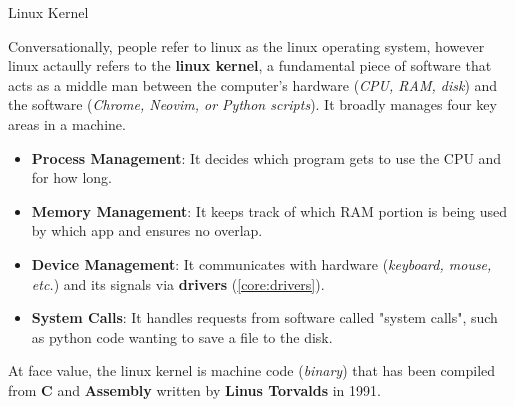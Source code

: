 \documentclass[10pt]{article}
\begin{document}
    \begin{core}{Linux Kernel}

      Conversationally, people refer to linux as the linux operating system, however linux actaully refers to the \textbf{linux kernel}, a fundamental piece of software that acts as a middle man between the computer's hardware (\textit{CPU, RAM, disk}) and the software (\textit{Chrome, Neovim, or Python scripts}). It broadly manages four key areas in a machine.

      \begin{itemize}

        \item \textbf{Process Management}: It decides which program gets to use the CPU and for how long.

        \item \textbf{Memory Management}: It keeps track of which RAM portion is being used by which app and ensures no overlap.

        \item \textbf{Device Management}: It communicates with hardware (\textit{keyboard, mouse, etc.}) and its signals via \textbf{drivers} (\autoref{core:drivers}).

        \item \textbf{System Calls}: It handles requests from software called "system calls", such as python code wanting to save a file to the disk.

      \end{itemize}      

      At face value, the linux kernel is machine code (\textit{binary}) that has been compiled from \textbf{C} and \textbf{Assembly} written by \textbf{Linus Torvalds} in 1991.

    \end{core}
\end{document}
